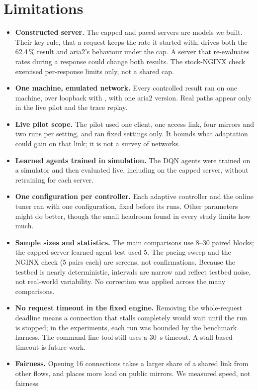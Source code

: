 \section{Limitations}\label{sec:limits}
\begin{itemize}
\item \textbf{Constructed server.} The capped and paced servers are models we built. Their key rule, that a request keeps the rate it started with, drives both the 62.4\,\% result and aria2's behaviour under the cap. A server that re-evaluates rates during a response could change both results. The stock-NGINX check exercised per-response limits only, not a shared cap.
\item \textbf{One machine, emulated network.} Every controlled result ran on one machine, over loopback with , with one aria2 version. Real paths appear only in the live pilot and the trace replay.
\item \textbf{Live pilot scope.} The pilot used one client, one access link, four mirrors and two runs per setting, and ran fixed settings only. It bounds what adaptation could gain on that link; it is not a survey of networks.
\item \textbf{Learned agents trained in simulation.} The DQN agents were trained on a simulator and then evaluated live, including on the capped server, without retraining for each server.
\item \textbf{One configuration per controller.} Each adaptive controller and the online tuner ran with one configuration, fixed before its runs. Other parameters might do better, though the small headroom found in every study limits how much.
\item \textbf{Sample sizes and statistics.} The main comparisons use 8--30 paired blocks; the capped-server learned-agent test used 5. The pacing sweep and the NGINX check (5 pairs each) are screens, not confirmations. Because the testbed is nearly deterministic, intervals are narrow and reflect testbed noise, not real-world variability. No correction was applied across the many comparisons.
\item \textbf{No request timeout in the fixed engine.} Removing the whole-request deadline means a connection that stalls completely would wait until the run is stopped; in the experiments, each run was bounded by the benchmark harness. The command-line tool still uses a 30~s timeout. A stall-based timeout is future work.
\item \textbf{Fairness.} Opening 16 connections takes a larger share of a shared link from other flows, and places more load on public mirrors. We measured speed, not fairness.
\end{itemize}

